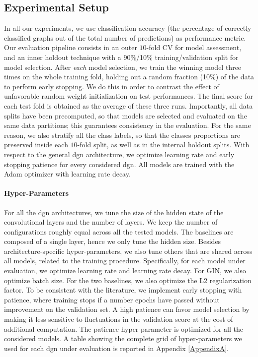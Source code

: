 \subsection{Experimental Setup}\label{sec:comparison-exp-setup}
In all our experiments, we use classification accuracy (\ie the percentage of correctly classified graphs out of the total number of predictions) as performance metric.
Our evaluation pipeline consists in an outer $10$-fold CV for model assessment, and an inner holdout technique with a 90\%/10\% training/validation split for model selection. After \emph{each} model selection, we train the winning model three times on the whole training fold, holding out a random fraction (10\%) of the data to perform early stopping. We do this in order to contrast the effect of unfavorable random weight initialization on test performances. The final score for each test fold is obtained as the average of these three runs. Importantly, all data splits have been precomputed, so that models are selected and evaluated on the same data partitions; this guarantees consistency in the evaluation. For the same reason, we also stratify all the class labels, so that the classes proportions are preserved inside each $10$-fold split, as well as in the internal holdout splits. With respect to the general \gls{dgn} architecture, we optimize learning rate and early stopping patience for every considered \gls{dgn}. All models are trained with the Adam \citep{kingma2015adam} optimizer with learning rate decay.

\paragraph{Hyper-Parameters}
For all the \gls{dgn} architectures, we tune the size of the hidden state of the convolutional layers and the number of layers. We keep the number of configurations roughly equal across all the tested models. The baselines are composed of a single layer, hence we only tune the hidden size. Besides architecture-specific hyper-parameters, we also tune others that are shared across all models, related to the training procedure. Specifically, for each model under evaluation, we optimize learning rate and learning rate decay. For GIN, we also optimize batch size. For the two baselines, we also optimize the L2 regularization factor. To be consistent with the literature, we implement early stopping with patience, where training stops if a number epochs have passed without improvement on the validation set. A high patience can favor model selection by making it less sensitive to fluctuations in the validation score at the cost of additional computation. The patience hyper-parameter is optimized for all the considered models. A table showing the complete grid of hyper-parameters we used for each \gls{dgn} under evaluation is reported in Appendix \ref{AppendixA}.

